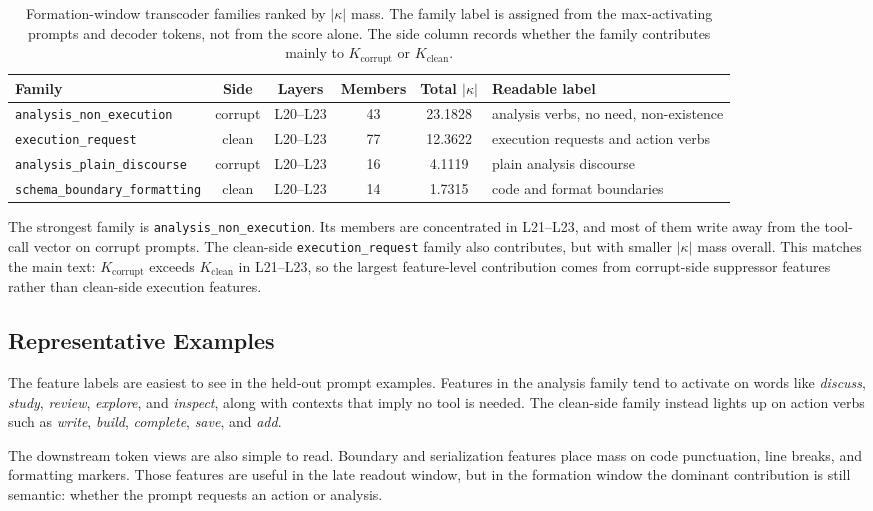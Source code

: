 \begin{table}[h]
\centering
\small
  \caption{Formation-window transcoder families ranked by $|\kappa|$ mass. The
family label is assigned from the max-activating prompts and decoder tokens,
not from the score alone. The side column records whether the family contributes
mainly to $K_{\mathrm{corrupt}}$ or $K_{\mathrm{clean}}$.}
\label{tab:appendix-transcoder-families}
\begin{tabularx}{\linewidth}{lccccX}
\toprule
Family & Side & Layers & Members & Total $|\kappa|$ & Readable label \\
\midrule
  \texttt{analysis\_non\_execution} & corrupt & L20--L23 & 43 & 23.1828 & analysis verbs, no need, non-existence \\
  \texttt{execution\_request} & clean & L20--L23 & 77 & 12.3622 & execution requests and action verbs \\
  \texttt{analysis\_plain\_discourse} & corrupt & L20--L23 & 16 & 4.1119 & plain analysis discourse \\
  \texttt{schema\_boundary\_formatting} & clean & L20--L23 & 14 & 1.7315 & code and format boundaries \\
\bottomrule
\end{tabularx}
\end{table}

The strongest family is \texttt{analysis\_non\_execution}. Its members are
concentrated in L21--L23, and most of them write away from the tool-call
vector on corrupt prompts. The clean-side \texttt{execution\_request} family
also contributes, but with smaller $|\kappa|$ mass overall. This matches the
main text: $K_{\mathrm{corrupt}}$ exceeds $K_{\mathrm{clean}}$ in L21--L23,
so the largest feature-level contribution comes from corrupt-side suppressor
features rather than clean-side execution features.

\subsection{Representative Examples}
The feature labels are easiest to see in the held-out prompt examples.
Features in the analysis family tend to activate on words like
\textit{discuss}, \textit{study}, \textit{review}, \textit{explore}, and
\textit{inspect}, along with contexts that imply no tool is needed.
The clean-side family instead lights up on action verbs such as
\textit{write}, \textit{build}, \textit{complete}, \textit{save}, and
\textit{add}.

The downstream token views are also simple to read.
Boundary and serialization features place mass on code punctuation, line
breaks, and formatting markers.
Those features are useful in the late readout window, but in the formation
window the dominant contribution is still semantic: whether the prompt requests
an action or analysis.

